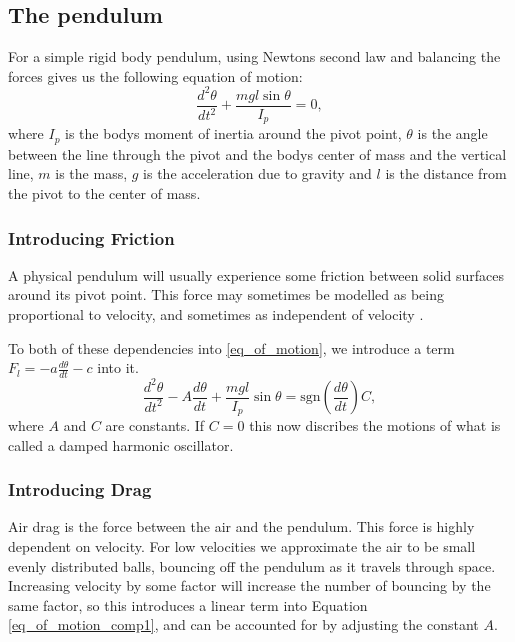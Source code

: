 \documentclass[11pt, a4paper]{article}
\begin{document}
\subsection{The pendulum}
For a simple rigid body pendulum, using Newtons second law and balancing the
forces gives us the following
equation of motion:
\begin{equation}
  \frac{d^2\theta}{dt^2} + \frac{mgl\sin{\theta}}{I_p} = 0,
  \label{eq_of_motion}
\end{equation}
where $I_p$ is the bodys moment of inertia around the pivot point, $\theta$ is the
angle between the line through the pivot and the bodys center of mass and the
vertical line, $m$ is the mass, $g$ is the acceleration due to gravity and
$l$ is the distance from the pivot to the center of mass.



\subsubsection{Introducing Friction}
A physical pendulum will usually experience some friction between solid
surfaces around its pivot point.
This force may sometimes be modelled as being proportional to velocity\cite[p. 30]{book},
and sometimes as independent of velocity \cite{friction}.

To both of these dependencies into \ref{eq_of_motion}, 
we introduce a term $F_l = -a \frac{d\theta}{dt} - c$ into it. 
\begin{equation}
    \frac{d^2\theta}{dt^2} 
  - A \frac{d\theta}{dt}
  + \frac{mgl}{I_p}\sin{\theta} = \text{sgn}(\frac{d\theta}{dt})C,
  \label{eq_of_motion_comp1}
\end{equation}
where $A$ and $C$ are constants.
If $C = 0$ this now discribes the motions of what is 
called a damped harmonic oscillator\cite{osc}.

\subsubsection{Introducing Drag}
Air drag is the force between the air and the pendulum. 
This force is highly dependent on velocity.
For low velocities we approximate the air to be small evenly distributed balls, bouncing off the
pendulum as it travels through space. 
Increasing velocity by some factor will increase the number of bouncing by the same
factor, so this introduces a linear term into 
Equation \ref{eq_of_motion_comp1}, and can be accounted for by adjusting the constant
$A$.
\end{document}
